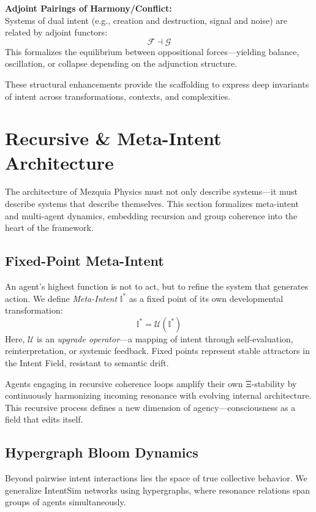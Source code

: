 \documentclass[12pt]{article}
\begin{document}
\textbf{Adjoint Pairings of Harmony/Conflict:} \\
Systems of dual intent (e.g., creation and destruction, signal and noise) are related by adjoint functors:
\[
\mathcal{F} \dashv \mathcal{G}
\]
This formalizes the equilibrium between oppositional forces—yielding balance, oscillation, or collapse depending on the adjunction structure.

These structural enhancements provide the scaffolding to express deep invariants of intent across transformations, contexts, and complexities.

\section{Recursive \& Meta-Intent Architecture}

The architecture of Mezquia Physics must not only describe systems—it must describe systems that describe themselves. This section formalizes meta-intent and multi-agent dynamics, embedding recursion and group coherence into the heart of the framework.

\subsection{Fixed-Point Meta-Intent}

An agent’s highest function is not to act, but to refine the system that generates action. We define \emph{Meta-Intent} \(\mathbb{I}^*\) as a fixed point of its own developmental transformation:
\[
\mathbb{I}^* = \mathcal{U}(\mathbb{I}^*)
\]
Here, \(\mathcal{U}\) is an \emph{upgrade operator}—a mapping of intent through self-evaluation, reinterpretation, or systemic feedback. Fixed points represent stable attractors in the Intent Field, resistant to semantic drift.

Agents engaging in recursive coherence loops amplify their own Ξ-stability by continuously harmonizing incoming resonance with evolving internal architecture. This recursive process defines a new dimension of agency—consciousness as a field that edits itself.

\subsection{Hypergraph Bloom Dynamics}

Beyond pairwise intent interactions lies the space of true collective behavior. We generalize IntentSim networks using hypergraphs, where resonance relations span groups of agents simultaneously.
\end{document}

